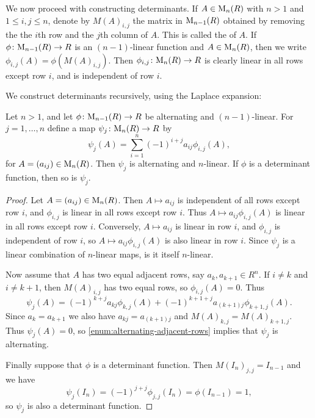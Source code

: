 We now proceed with constructing determinants. If $A \in \mathrm{M}_{n}(R)$ with $n > 1$ and $1 \leq i,j \leq n$, denote by $M(A)_{i,j}$ the matrix in $\mathrm{M}_{n-1}(R)$ obtained by removing the the $i$th row and the $j$th column of $A$. This is called the  of $A$. If $\phi \colon \mat{n-1}{R} \to R$ is an $(n-1)$-linear function and $A \in \mathrm{M}_{n}(R)$, then we write $\phi_{i,j}(A) = \phi(M(A)_{i,j})$. Then $\phi_{i,j} \colon \mat{n}{R} \to R$ is clearly linear in all rows except row $i$, and is independent of row $i$.

We construct determinants recursively, using the Laplace expansion:

\begin{theorem}
    \label{thm:determinant-recursive-definition}
    Let $n > 1$, and let $\phi \colon \mat{n-1}{R} \to R$ be alternating and $(n-1)$-linear. For $j = 1, \ldots, n$ define a map $\psi_j \colon \mathrm{M}_{n}(R) \to R$ by
    \begin{equation*}
        \psi_j(A)
            = \sum_{i=1}^n (-1)^{i+j} a_{ij} \phi_{i,j}(A),
    \end{equation*}
    for $A = (a_{ij}) \in \mathrm{M}_{n}(R)$. Then $\psi_j$ is alternating and $n$-linear. If $\phi$ is a determinant function, then so is $\psi_j$.
\end{theorem}

\begin{proof}
    Let $A = (a_{ij}) \in \mathrm{M}_{n}(R)$. Then $A \mapsto a_{ij}$ is independent of all rows except row $i$, and $\phi_{i,j}$ is linear in all rows except row $i$. Thus $A \mapsto a_{ij} \phi_{i,j}(A)$ is linear in all rows except row $i$. Conversely, $A \mapsto a_{ij}$ is linear in row $i$, and $\phi_{i,j}$ is independent of row $i$, so $A \mapsto a_{ij} \phi_{i,j}(A)$ is also linear in row $i$. Since $\psi_j$ is a linear combination of $n$-linear maps, is it itself $n$-linear.

    Now assume that $A$ has two equal adjacent rows, say $a_k, a_{k+1} \in R^n$. If $i \neq k$ and $i \neq k+1$, then $M(A)_{i,j}$ has two equal rows, so $\phi_{i,j}(A) = 0$. Thus
    \begin{equation*}
        \psi_j(A)
            = (-1)^{k+j} a_{kj} \phi_{k,j}(A)
              + (-1)^{k+1+j} a_{(k+1)j} \phi_{k+1,j}(A).
    \end{equation*}
    Since $a_k = a_{k+1}$ we also have $a_{kj} = a_{(k+1)j}$ and $M(A)_{k,j} = M(A)_{k+1,j}$. Thus $\psi_j(A) = 0$, so \cref{enum:alternating-adjacent-rows} implies that $\psi_j$ is alternating.

    Finally suppose that $\phi$ is a determinant function. Then $M(I_n)_{j,j} = I_{n-1}$ and we have
    \begin{equation*}
        \psi_j(I_n)
            = (-1)^{j+j} \phi_{j,j}(I_n)
            = \phi(I_{n-1})
            = 1,
    \end{equation*}
    so $\psi_j$ is also a determinant function.
\end{proof}


